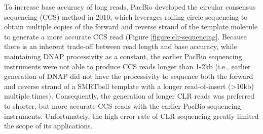 To increase base accuracy of long reads, PacBio developed the circular consensus sequencing (CCS) method in 2010, which leverages rolling circle sequencing to obtain multiple copies of the forward and reverse strand of the template molecule to generate a more accurate CCS read \cite{} (Figure \ref{figure:clr-sequencing}. Because there is an inherent trade-off between read length and base accuracy, while maintaining DNAP processivity as a constant, the earlier PacBio sequencing instruments were not able to produce CCS reads longer than 1-2kb (i.e., earlier generation of DNAP did not have the processivity to sequence both the forward and reverse strand of a SMRTbell template with a longer read-of-insert (>10kb) multiple times). Consequently, the generation of longer CLR reads was preferred to shorter, but more accurate CCS reads with the earlier PacBio sequencing instruments. Unfortunately, the high error rate of CLR sequencing greatly limited the scope of its applications. 


